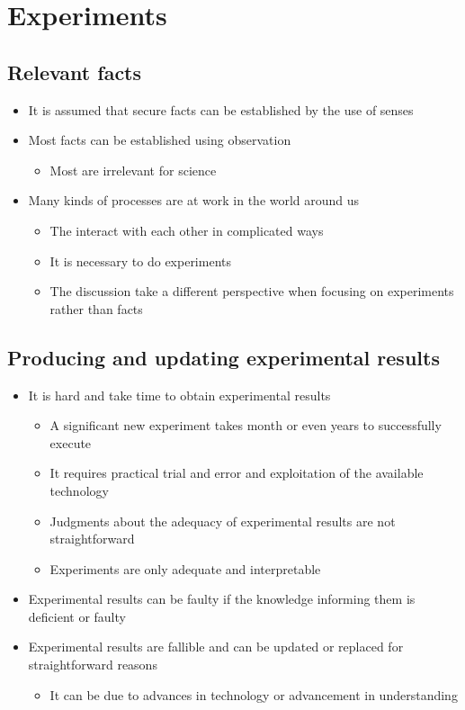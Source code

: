 \documentclass[11pt]{article}
\author{Martin Nørskov Jensen}
\date{\today}
\title{}
\begin{document}
\tableofcontents

\section{Experiments}
\label{sec:org2e7f5df}
\subsection{Relevant facts}
\label{sec:org5d7e7b5}
\begin{itemize}
\item It is assumed that secure facts can be established by the use of senses
\item Most facts can be established using observation
\begin{itemize}
\item Most are irrelevant for science
\end{itemize}
\item Many kinds of processes are at work in the world around us
\begin{itemize}
\item The interact with each other in complicated ways
\item It is necessary to do experiments
\item The discussion take a different perspective when focusing on experiments rather than facts
\end{itemize}
\end{itemize}

\subsection{Producing and updating experimental results}
\label{sec:org54f586c}
\begin{itemize}
\item It is hard and take time to obtain experimental results
\begin{itemize}
\item A significant new experiment takes month or even years to successfully execute
\item It requires practical trial and error and exploitation of the available technology
\item Judgments about the adequacy of experimental results are not straightforward
\item Experiments are only adequate and interpretable
\end{itemize}
\item Experimental results can be faulty if the knowledge informing them is deficient or faulty
\item Experimental results are fallible and can be updated or replaced for straightforward reasons
\begin{itemize}
\item It can be due to advances in technology or advancement in understanding
\end{itemize}
\end{itemize}
\end{document}
